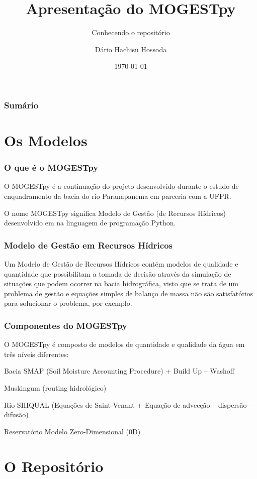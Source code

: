 \documentclass[aspectratio=169]{beamer}
\title[MOGESTpy]{Apresentação do MOGESTpy}
\subtitle{Conhecendo o repositório}
\author{Dário Hachisu Hossoda}
\institute[POLI-USP]{Escola Politécnica da Universidade de São Paulo}
\date{\today}
\begin{document}
\frame{\titlepage}

\begin{frame}
	\frametitle{Sumário}
	\tableofcontents
\end{frame}

\section{Os Modelos}

\begin{frame}
\frametitle{O que é o MOGESTpy}
O MOGESTpy é a continuação do projeto desenvolvido durante o estudo de enquadramento da bacia do rio Paranapanema em parceria com a UFPR.

\vspace{1cm}

O nome \alert{MOGESTpy} significa \alert{Mo}delo de \alert{Gest}ão (de Recursos Hídricos) desenvolvido em na linguagem de programação \alert{Py}thon.
\end{frame}

\begin{frame}
\frametitle{Modelo de Gestão em Recursos Hídricos}
Um Modelo de Gestão de Recursos Hídricos contém modelos de qualidade e quantidade que possibilitam a tomada de decisão através da simulação de situações que podem ocorrer na bacia hidrográfica, visto que se trata de um problema de gestão e equações simples de balanço de massa não são satisfatórios para solucionar o problema, por exemplo.
\end{frame}

\begin{frame}
\frametitle{Componentes do MOGESTpy}
O MOGESTpy é composto de modelos de quantidade e qualidade da água em três níveis diferentes:
\begin{block}{Bacia}
SMAP (Soil Moisture Accounting Procedure) + Build Up -- Washoff

Muskingum (routing hidrológico)
\end{block}

\begin{block}{Rio}
SIHQUAL (Equações de Saint-Venant + Equação de advecção -- dispersão -- difusão)
\end{block}

\begin{block}{Reservatório}
Modelo Zero-Dimensional (0D)
\end{block}
\end{frame}

\section{O Repositório}
\end{document}
